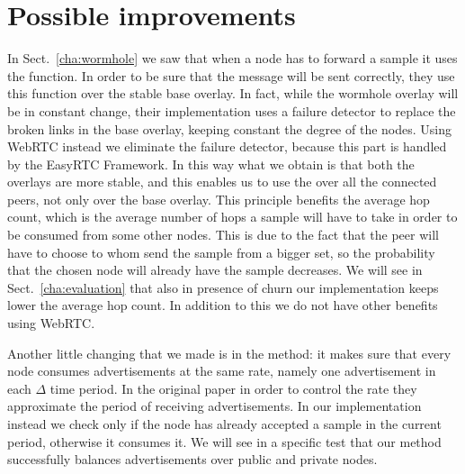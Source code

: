 \section{Possible improvements}
\label{sec:improvements}
In Sect.~\ref{cha:wormhole} we saw that when a node has to forward a sample it uses the \getMetropolisHastingsNeighbour function. In order to be sure that the message will be sent correctly, they use this function over the stable base overlay. In fact, while the wormhole overlay will be in constant change, their implementation uses a failure detector to replace the broken links in the base overlay, keeping constant the degree of the nodes. Using WebRTC instead we eliminate the failure detector, because this part is handled by the EasyRTC Framework. In this way what we obtain is that both the overlays are more stable, and this enables us to use the \getMetropolisHastingsNeighbour over all the connected peers, not only over the base overlay. This principle benefits the average hop count, which is the average number of hops a sample will have to take in order to be consumed from some other nodes. This is due to the fact that the peer will have to choose to whom send the sample from a bigger set, so the probability that the chosen node will already have the sample decreases. We will see in Sect.~\ref{cha:evaluation} that also in presence of churn our implementation keeps lower the average hop count. In addition to this we do not have other benefits using WebRTC. 

Another little changing that we made is in the \acceptAd method: it makes sure that every node consumes advertisements at the same rate, namely one advertisement in each $\Delta$ time period. In the original paper in order to control the rate they approximate the period of receiving advertisements. In our implementation instead we check only if the node has already accepted a sample in the current period, otherwise it consumes it. We will see in a specific test that our \acceptAd method successfully balances advertisements over public and private nodes.
